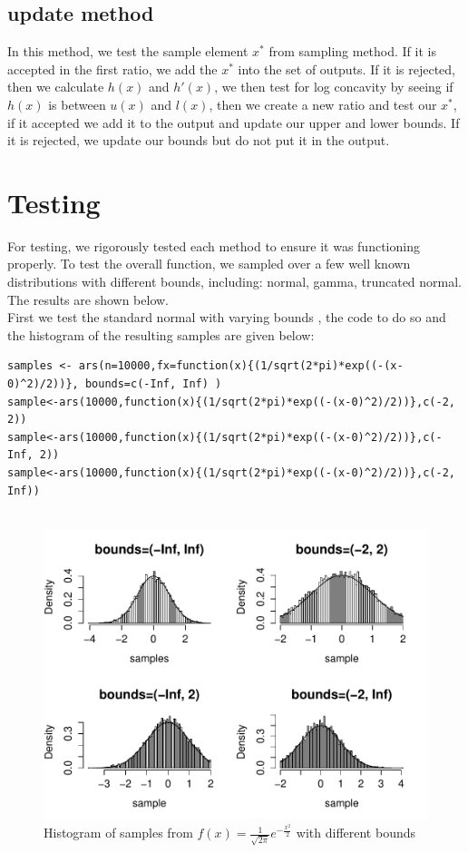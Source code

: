\documentclass[11pt, oneside]{article}   	%
\begin{document}
\subsection*{ update method }
In this method, we test the sample element $x^{*}$ from sampling method. If it is accepted in the first ratio,  we add the $x^{*}$ into the set of outputs. If it is rejected, then we calculate $h(x)$ and $h'(x)$, we then test for log concavity by seeing if $h(x)$ is between $u(x)$ and $l(x)$, then we create a new ratio and test our $x^*$, if it accepted we add it to the output and update our upper and lower bounds. If it is rejected, we update our bounds but do not put it in the output.




\section{Testing}

For testing, we rigorously tested each method to ensure it was functioning properly.  To test the overall function, we sampled over a few well known distributions with different bounds, including:  normal, gamma, truncated normal.  The results are shown below.\\
First we test the standard normal with varying bounds , the code to do so and the histogram of the resulting samples are given below: \newline

\begin{lstlisting}[frame=single]
samples <- ars(n=10000,fx=function(x){(1/sqrt(2*pi)*exp((-(x-0)^2)/2))}, bounds=c(-Inf, Inf) )
sample<-ars(10000,function(x){(1/sqrt(2*pi)*exp((-(x-0)^2)/2))},c(-2, 2))
sample<-ars(10000,function(x){(1/sqrt(2*pi)*exp((-(x-0)^2)/2))},c(-Inf, 2))
sample<-ars(10000,function(x){(1/sqrt(2*pi)*exp((-(x-0)^2)/2))},c(-2, Inf))


\end{lstlisting}


\begin{figure}[htbp!]
 \centering
\caption{Histogram of samples from $f(x)=\frac{1}{\sqrt{2\pi}}e^{-\frac{x^2}{2}}$ with different bounds}
  \includegraphics[width=1.0\textwidth]{standardnormal}
\end{figure}
\end{document}
